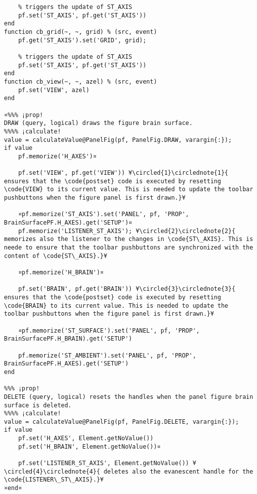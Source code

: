 \documentclass{tufte-handout}
\begin{document}
\begin{lstlisting}
    % triggers the update of ST_AXIS
    pf.set('ST_AXIS', pf.get('ST_AXIS'))
end
function cb_grid(~, ~, grid) % (src, event)
    pf.get('ST_AXIS').set('GRID', grid);

    % triggers the update of ST_AXIS
    pf.set('ST_AXIS', pf.get('ST_AXIS'))
end
function cb_view(~, ~, azel) % (src, event)
    pf.set('VIEW', azel)
end

¤%%% ¡prop!
DRAW (query, logical) draws the figure brain surface.
%%%% ¡calculate!
value = calculateValue@PanelFig(pf, PanelFig.DRAW, varargin{:});
if value
    pf.memorize('H_AXES')¤

    pf.set('VIEW', pf.get('VIEW')) ¥\circled{1}\circlednote{1}{ ensures that the \code{postset} code is executed by resetting \code{VIEW} to its current value. This is needed to update the toolbar pushbuttons when the figure panel is first drawn.}¥

    ¤pf.memorize('ST_AXIS').set('PANEL', pf, 'PROP', BrainSurfacePF.H_AXES).get('SETUP')¤
    pf.memorize('LISTENER_ST_AXIS'); ¥\circled{2}\circlednote{2}{ memorizes also the listener to the changes in \code{ST\_AXIS}. This is neede to ensure that the toolbar pushbuttons are synchronized with the content of \code{ST\_AXIS}.}¥
    
    ¤pf.memorize('H_BRAIN')¤

    pf.set('BRAIN', pf.get('BRAIN')) ¥\circled{3}\circlednote{3}{ ensures that the \code{postset} code is executed by resetting \code{BRAIN} to its current value. This is needed to update the toolbar pushbuttons when the figure panel is first drawn.}¥

    ¤pf.memorize('ST_SURFACE').set('PANEL', pf, 'PROP', BrainSurfacePF.H_BRAIN).get('SETUP')
    
    pf.memorize('ST_AMBIENT').set('PANEL', pf, 'PROP', BrainSurfacePF.H_AXES).get('SETUP')
end

%%% ¡prop!
DELETE (query, logical) resets the handles when the panel figure brain surface is deleted.
%%%% ¡calculate!
value = calculateValue@PanelFig(pf, PanelFig.DELETE, varargin{:});
if value
    pf.set('H_AXES', Element.getNoValue())
    pf.set('H_BRAIN', Element.getNoValue())¤

    pf.set('LISTENER_ST_AXIS', Element.getNoValue()) ¥\circled{4}\circlednote{4}{ deletes also the evanescent handle for the \code{LISTENER\_ST\_AXIS}.}¥
¤end¤
\end{lstlisting}
\end{document}
